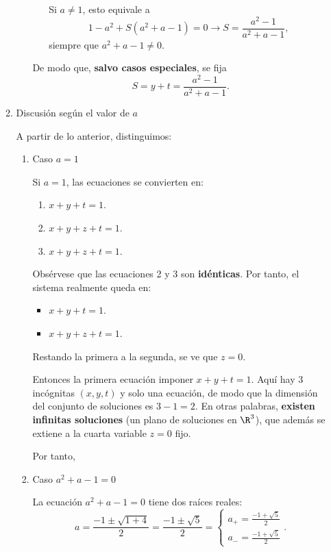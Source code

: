 \begin{enumerate}[label=\color{red}\textbf{\arabic*)}]
\begin{enumerate}[label=\arabic*), leftmargin=*]
\begin{enumerate}[label=1.\arabic*), leftmargin=*]
\begin{enumerate}[label=\arabic*)]
                Si $a\neq 1$, esto equivale a \[
                1-a^2+S(a^2+a-1)=0\longrightarrow S=\dfrac{a^2-1}{a^2+a-1},
                \] 
                siempre que $a^2+a-1\neq 0$.
        \end{enumerate}
        De modo que, \textbf{salvo casos especiales}, se fija \[
        S=y+t=\dfrac{a^2-1}{a^2+a-1}.
        \]  
        \end{enumerate}
    \item Discusión según el valor de $a$

        A partir de lo anterior, distinguimos:
         \begin{enumerate}[label=2.\arabic*), leftmargin=*]
            \item Caso $a=1$

                Si  $a=1$, las ecuaciones se convierten en:
                 \begin{enumerate}[label=\arabic*.]
                    \item $x+y+t=1$.
                    \item  $x+y+z+t=1$.
                    \item  $x+y+z+t=1$.
                \end{enumerate}
                Obsérvese que las ecuaciones 2 y 3 son \textbf{idénticas}. Por tanto, el sistema realmente queda en: 
                \begin{itemize}[label=\textbullet]
                    \item $x+y+t=1$.
                    \item  $x+y+z+t=1$.
                \end{itemize}
                Restando la primera a la segunda, se ve que $z=0$.

                Entonces la primera ecuación imponer  $x+y+t=1$. Aquí hay 3 incógnitas  $(x,y,t)$ y solo una ecuación, de modo que la dimensión del conjunto de soluciones es  $3-1=2$. En otras palabras,  \textbf{existen infinitas soluciones} (un plano de soluciones en $\R^3$), que además se extiene a la cuarta variable $z=0$ fijo.

                Por tanto,
                 \begin{center}
                \end{center}
            \item Caso $a^2+a-1=0$

                La ecuación $a^2+a-1=0$ tiene dos raíces reales: \[
                a=\dfrac{-1\pm\sqrt{1+4} }{2}=\dfrac{-1\pm\sqrt{5} }{2}=\begin{cases}
                    a_+=\frac{-1+\sqrt{5} }{2} \\
                    a_-=\frac{-1+\sqrt{5} }{2} 
                \end{cases}.
                \] 


\end{enumerate}
\end{enumerate}
\end{enumerate}

